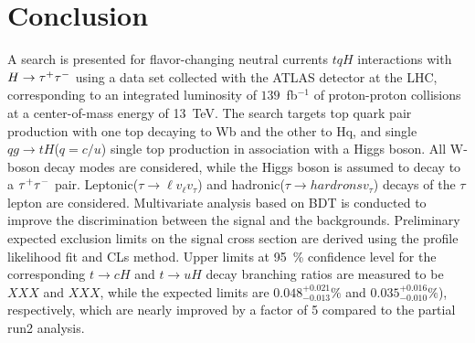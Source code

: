 \section{Conclusion}
\label{sec:conclusion}

A search is presented for flavor-changing neutral currents $tqH$ interactions with $H\to\tau^{+}\tau^{-}$ using a data set collected with the ATLAS
detector at the LHC, corresponding to an integrated luminosity of $139$~fb$^{-1}$ of proton-proton collisions at a center-of-mass energy of 13~TeV.
The search targets top quark pair production with one top decaying to Wb and the other to Hq, and single $qg \to tH$($q=c/u$) single top production in association with a Higgs boson. All W-boson decay modes are considered, while the Higgs boson is assumed to decay to a $\tau^{+}\tau^{-}$ pair. Leptonic($\tau \rightarrow \ell v_{\ell} v_{\tau}$) and hadronic($\tau \rightarrow hardrons v_{\tau}$) decays of the $\tau$ lepton are considered.
Multivariate analysis based on BDT is conducted to improve the discrimination between the signal and the backgrounds. Preliminary expected exclusion limits on the signal cross section are derived using the profile likelihood fit and CLs method. Upper limits at 95~\% confidence level for the corresponding $t\to cH$ and $t\to uH$ decay branching ratios are measured to be $XXX$ and $XXX$, while the expected limits are $0.048^{+0.021}_{-0.013}\%$ and $0.035^{+0.016}_{-0.010}\%$), respectively, which are nearly improved by a factor of 5 compared to the partial run2 analysis. 